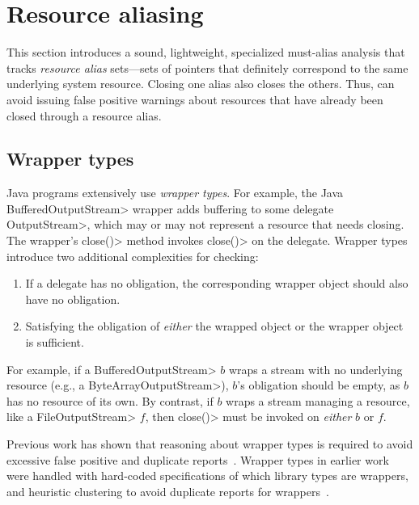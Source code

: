 \section{Resource aliasing}
\label{sec:must-call-choice}


This section introduces a sound, lightweight, specialized must-alias analysis
that tracks \emph{resource alias} sets---sets of pointers that
definitely correspond to the same underlying system resource.  Closing
one alias also closes the others.  Thus,
\tool can avoid issuing false positive warnings about resources
that have already been closed through a resource alias.

\subsection{Wrapper types}
\label{sec:wrapper-types}

Java programs extensively use \emph{wrapper types}.  For example, the Java
\<BufferedOutputStream> wrapper adds buffering to some delegate \<OutputStream>, which
may or may not represent a resource that needs closing.  The wrapper's 
\<close()> method invokes \<close()> on the delegate.
Wrapper types
introduce two additional complexities for \MustCall checking:
\begin{enumerate}
  \item If a delegate has no \MustCall obligation, the corresponding
  wrapper object should also have no obligation.
  \item Satisfying the obligation of \emph{either} the wrapped object or the
  wrapper object is sufficient.
\end{enumerate}
For example, if a \<BufferedOutputStream> $b$ wraps a stream with no underlying
resource (e.g., a \<ByteArrayOutputStream>), $b$'s
\MustCall obligation should be empty,
as $b$ has no resource of its own.  By contrast,
if $b$ wraps a stream managing a resource, like a \<File\-Out\-put\-Stream> $f$,
then \<close()> must be invoked on \emph{either} $b$ or $f$.

Previous work has shown that reasoning about wrapper types is
required to avoid excessive false positive and duplicate
reports~\cite{TorlakC10,ecj-resource-leak}.  Wrapper types in earlier
work were handled with hard-coded specifications of which library
types are wrappers, and heuristic clustering to avoid duplicate reports for
wrappers~\cite{TorlakC10}.

